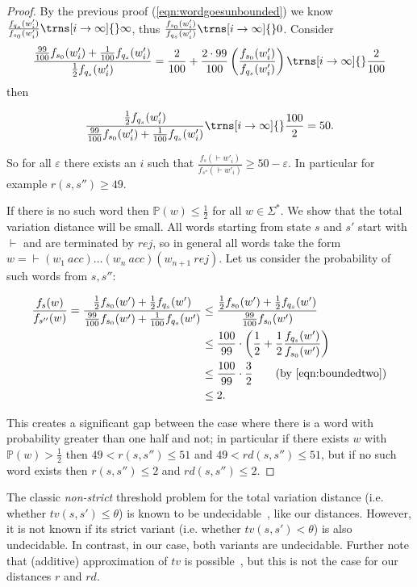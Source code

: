 \documentclass[10pt,a4paper]{amsart}
\numberwithin{equation}{section}
\theoremstyle{plain}
\theoremstyle{definition}
\theoremstyle{remark}
\newcommand\acc{\mathit{acc}}
\newcommand\rej{\mathit{rej}}
\newcommand\pbra[1]{\left( #1 \right)}
\newcommand\pr{\mathbb{P}}
\newcommand\tvra{\mathit{r}}
\newcommand\tvrs{\mathit{rd}}
\newcommand\tvstandard{\mathit{tv}}
\renewcommand\nu{f}
\begin{document}
\begin{proof}
By the previous proof (\cref{eqn:wordgoesunbounded}) we know $\frac{\nu_{q_s}(w'_i)}{\nu_{s_0}(w'_i)} \trns[i \to \infty]{} \infty$, thus $\frac{\nu_{s_0}(w'_i)}{\nu_{q_s}(w'_i)} \trns[i \to \infty]{} 0$.
Consider
\[\frac{\frac{99}{100}\nu_{s_0}(w'_i)+ \frac{1}{100}\nu_{q_s}(w'_i)}{\frac{1}{2}\nu_{q_s}(w'_i)} = \frac{2}{100} + \frac{2\cdot 99}{100}\pbra{\frac{\nu_{s_0}(w'_i)}{\nu_{q_s}(w'_i)}}
\trns[i \to \infty]{} \frac{2}{100}
\]
then

\[\frac{\frac{1}{2}\nu_{q_s}(w'_i)}{\frac{99}{100}\nu_{s_0}(w'_i)+ \frac{1}{100}\nu_{q_s}(w'_i)} \trns[i \to \infty]{} \frac{100}{2} = 50.\]

So for all $\varepsilon$ there exists an $i$ such that $\frac{\nu_s({\vdash}w'_i)}{\nu_{s''}({\vdash}w'_i)} \ge 50- \varepsilon$. In particular for example $\tvra(s,s'') \ge 49$.

If there is no such word then  $\pr(w) \le \frac{1}{2}$ for all $w\in\Sigma^*$. We show that the total variation distance will be small. All words starting from state $s$ and $s'$ start with ${\vdash}$ and are terminated by $\rej$, so in general all words take the form $w = {\vdash}(w_1\ \acc)\dots (w_n\ \acc)(w_{n+1}\ \rej)$. Let us consider the probability of such words from $s,s''$:

\begin{align*}
\frac{\nu_s(w)}{\nu_{s''}(w)}
= \frac{\frac{1}{2}\nu_{s_0}(w') + \frac{1}{2}\nu_{q_s}(w')}{\frac{99}{100}\nu_{s_0}(w')+ \frac{1}{100}\nu_{q_s}(w')}
& \le  \frac{\frac{1}{2}\nu_{s_0}(w') + \frac{1}{2}\nu_{q_s}(w')}{\frac{99}{100}\nu_{s_0}(w')}
\\& \le \frac{100}{99}\cdot \pbra{\frac{1}{2} + \frac{1}{2} \frac{\nu_{q_s}(w')}{\nu_{s_0}(w')}}
\\&\le \frac{100}{99}\cdot \frac{3}{2}   \tag{by \cref{eqn:boundedtwo}}
\\ &\le 2.
\end{align*}

This creates a significant gap between the case where there is a word with probability greater than one half and not; in particular if there exists $ w$ with $\pr(w) > \frac{1}{2}$ then $49 < \tvra(s,s'') \le 51$ and $ 49 < \tvrs(s,s'') \le 51$, but if no such word exists then $\tvra(s,s'') \le 2$ and $\tvrs(s,s'') \le 2$.
\end{proof}

\begin{rem}
The classic \emph{non-strict} threshold problem for the  total variation distance (i.e. whether $\tvstandard(s,s') \le \theta$) is  known to be undecidable~\cite{kiefer2018computing}, like our distances.
However,   it is not known if its strict variant  (i.e. whether $\tvstandard(s,s') < \theta$) is also undecidable. In contrast, in our case, both variants are undecidable. Further note that (additive) approximation of $\tvstandard$ is possible~\cite{kiefer2018computing,chen2014total}, but this is not the case for our distances $\tvra$ and $\tvrs$.
\end{rem}
\end{document}
